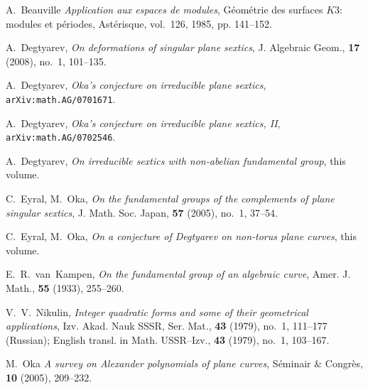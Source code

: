 \documentclass{amsart}
\theoremstyle{remark}
\numberwithin{equation}{section}
\begin{document}
\begin{thebibliography}{99}

A.~Beauville
{\em Application aux espaces de modules},
G\'eom\'etrie des surfaces $K3${\/{\rm :}} modules et p\'eriodes,
Ast\'erisque, vol.~126, 1985, pp. 141--152.

A.~Degtyarev,
{\em On deformations of singular plane sextics},
J. Algebraic Geom., {\bf 17} (2008), no.~1, 101--135.

A.~Degtyarev,
{\em Oka's conjecture on irreducible plane sextics},
{\tt arXiv:math.AG/0701671}.

A.~Degtyarev,
{\em Oka's conjecture on irreducible plane sextics, {\/{\rm {II}}}},
{\tt arXiv:math.AG/0702546}.

A.~Degtyarev,
{\em On irreducible sextics with non-abelian fundamental group},
this volume.

C.~Eyral, M.~Oka,
{\em On the fundamental groups of the complements of plane singular
 sextics},
J. Math. Soc. Japan, {\bf57} (2005), no.~1, 37--54.

C.~Eyral, M.~Oka,
{\em On a conjecture of Degtyarev on non-torus plane curves},
this volume.

E.~R.~van~Kampen,
{\em On the fundamental group of an algebraic curve},
Amer. J. Math., {\bf 55} (1933), 255--260.

V.~V.~Nikulin,
{\em Integer quadratic forms and some of their geometrical applications},
Izv. Akad. Nauk SSSR, Ser. Mat., {\bf 43} (1979), no.~1, 111--177
(Russian);
English transl. in Math. USSR--Izv., {\bf 43} (1979), no.~1, 103--167.

M.~Oka
{\em A survey on Alexander polynomials of plane curves},
S\'eminair \& Congr\`es, {\bf10} (2005), 209--232.

\end{thebibliography}
\end{document}

